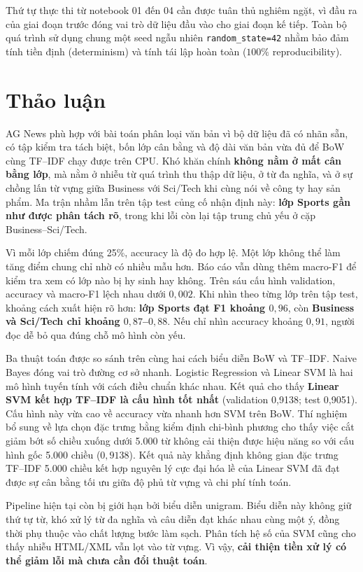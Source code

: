 \documentclass[12pt]{hcmut-report}
\newcommand{\firstparagraph}{\noindent\hspace*{2em}}
\begin{document}
Thứ tự thực thi từ notebook 01 đến 04 cần được tuân thủ nghiêm ngặt, vì đầu ra của giai đoạn trước đóng vai trò dữ liệu đầu vào cho giai đoạn kế tiếp. Toàn bộ quá trình sử dụng chung một seed ngẫu nhiên \texttt{random\_state=42} nhằm bảo đảm tính tiền định (determinism) và tính tái lập hoàn toàn ($100\%$ reproducibility).

\section{Thảo luận}

\firstparagraph AG News phù hợp với bài toán phân loại văn bản vì bộ dữ liệu đã có nhãn sẵn, có tập kiểm tra tách biệt, bốn lớp cân bằng và độ dài văn bản vừa đủ để BoW cùng TF--IDF chạy được trên CPU. Khó khăn chính \textbf{không nằm ở mất cân bằng lớp}, mà nằm ở nhiễu từ quá trình thu thập dữ liệu, ở từ đa nghĩa, và ở sự chồng lấn từ vựng giữa Business với Sci/Tech khi cùng nói về công ty hay sản phẩm. Ma trận nhầm lẫn trên tập test củng cố nhận định này: \textbf{lớp Sports gần như được phân tách rõ}, trong khi lỗi còn lại tập trung chủ yếu ở cặp Business--Sci/Tech.

Vì mỗi lớp chiếm đúng 25\%, accuracy là độ đo hợp lệ. Một lớp không thể làm tăng điểm chung chỉ nhờ có nhiều mẫu hơn. Báo cáo vẫn dùng thêm macro-F1 để kiểm tra xem có lớp nào bị hy sinh hay không. Trên sáu cấu hình validation, accuracy và macro-F1 lệch nhau dưới $0{,}002$. Khi nhìn theo từng lớp trên tập test, khoảng cách xuất hiện rõ hơn: \textbf{lớp Sports đạt F1 khoảng $0{,}96$}, còn \textbf{Business và Sci/Tech chỉ khoảng $0{,}87$--$0{,}88$}. Nếu chỉ nhìn accuracy khoảng $0{,}91$, người đọc dễ bỏ qua đúng chỗ mô hình còn yếu.

Ba thuật toán được so sánh trên cùng hai cách biểu diễn BoW và TF--IDF. Naive Bayes đóng vai trò đường cơ sở nhanh. Logistic Regression và Linear SVM là hai mô hình tuyến tính với cách điều chuẩn khác nhau. Kết quả cho thấy \textbf{Linear SVM kết hợp TF--IDF là cấu hình tốt nhất} (validation 0,9138; test 0,9051). Cấu hình này vừa cao về accuracy vừa nhanh hơn SVM trên BoW. Thí nghiệm bổ sung về lựa chọn đặc trưng bằng kiểm định chi-bình phương cho thấy việc cắt giảm bớt số chiều xuống dưới 5.000 từ không cải thiện được hiệu năng so với cấu hình gốc 5.000 chiều ($0{,}9138$). Kết quả này khẳng định không gian đặc trưng TF--IDF 5.000 chiều kết hợp nguyên lý cực đại hóa lề của Linear SVM đã đạt được sự cân bằng tối ưu giữa độ phủ từ vựng và chi phí tính toán.

Pipeline hiện tại còn bị giới hạn bởi biểu diễn unigram. Biểu diễn này không giữ thứ tự từ, khó xử lý từ đa nghĩa và câu diễn đạt khác nhau cùng một ý, đồng thời phụ thuộc vào chất lượng bước làm sạch. Phân tích hệ số của SVM cũng cho thấy nhiễu HTML/XML vẫn lọt vào từ vựng. Vì vậy, \textbf{cải thiện tiền xử lý có thể giảm lỗi mà chưa cần đổi thuật toán}.
\end{document}
